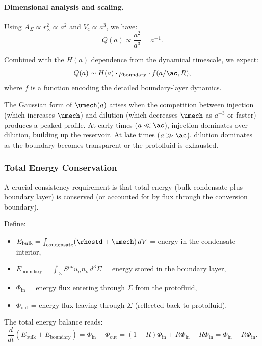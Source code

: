 \paragraph{Dimensional analysis and scaling.}

Using $A_\Sigma \propto r_\Sigma^2 \propto a^2$ and $V_{\mathrm{c}} \propto a^3$, we have:
\begin{equation}
Q(a) \propto \frac{a^2}{a^3} = a^{-1}.
\end{equation}

Combined with the $H(a)$ dependence from the dynamical timescale, we expect:
\begin{equation}
Q(a) \sim H(a) \cdot \rho_{\mathrm{boundary}} \cdot f(a/\ac, R),
\end{equation}
where $f$ is a function encoding the detailed boundary-layer dynamics.

The Gaussian form of $\umech(a)$ arises when the competition between injection (which increases $\umech$) and dilution (which decreases $\umech$ as $a^{-3}$ or faster) produces a peaked profile. At early times ($a \ll \ac$), injection dominates over dilution, building up the reservoir. At late times ($a \gg \ac$), dilution dominates as the boundary becomes transparent or the protofluid is exhausted.

\subsubsection{Total Energy Conservation}

A crucial consistency requirement is that total energy (bulk condensate plus boundary layer) is conserved (or accounted for by flux through the conversion boundary).

Define:
\begin{itemize}
    \item $E_{\mathrm{bulk}} = \int_{\mathrm{condensate}} (\rhostd + \umech) \, dV$ = energy in the condensate interior,
    \item $E_{\mathrm{boundary}} = \int_\Sigma S^{\mu\nu} u_\mu n_\nu \, d^3\Sigma$ = energy stored in the boundary layer,
    \item $\Phi_{\mathrm{in}}$ = energy flux entering through $\Sigma$ from the protofluid,
    \item $\Phi_{\mathrm{out}}$ = energy flux leaving through $\Sigma$ (reflected back to protofluid).
\end{itemize}

The total energy balance reads:
\begin{equation}
\frac{d}{dt}(E_{\mathrm{bulk}} + E_{\mathrm{boundary}}) = \Phi_{\mathrm{in}} - \Phi_{\mathrm{out}} = (1 - R)\Phi_{\mathrm{in}} + R\Phi_{\mathrm{in}} - R\Phi_{\mathrm{in}} = \Phi_{\mathrm{in}} - R\Phi_{\mathrm{in}}.
\end{equation}

